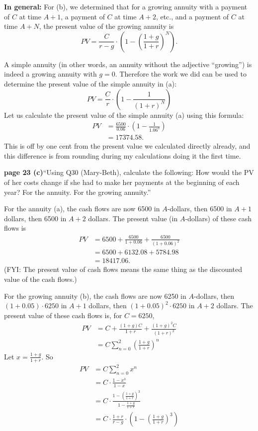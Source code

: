 \documentclass{amsart}
\begin{document}
\textbf{In general:} For (b), we determined that for a growing annuity
with a payment of $C$ at time $A+1$, a payment of $C$ at time $A+2$,
etc., and a payment of $C$ at time $A+N$, the present value of the growing annuity
is 
\begin{equation}
PV=\frac{C}{r-g} \cdot \left(1-\left(\frac{1+g}{1+r} \right)^N \right).
\end{equation}

A simple annuity (in other words, an annuity without the adjective ``growing'') is indeed a growing annuity with $g=0$. Therefore the work we
did can be used to determine the present value of the simple
annuity in (a):
\begin{equation}
PV = \frac{C}{r} \cdot \left(1-\frac{1}{(1+r)^N} \right)
\end{equation}
Let us calculate the present value of the simple annuity (a) using this
formula:
\begin{align*}
PV &= \frac{6500}{0.06} \cdot \left(1-\frac{1}{1.06^3} \right)\\
&=17374.58.
\end{align*}
This is off by one cent from the present value we calculated directly already,
and this difference is from rounding during my calculations doing it
the first time.

\newpage

\textbf{page 23 (c)}``Using Q30 (Mary-Beth), calculate the following:
How would the PV of her costs change if she had to make her payments at the beginning of each year? For the annuity. For the growing annuity.''

For the annuity (a), the cash flows are now
6500 in $A$-dollars, then 6500 in $A+1$ dollars, then 6500 in $A+2$
dollars. The present value (in $A$-dollars) of these cash flows is
\begin{align*}
PV&=6500+\frac{6500}{1+0.06} + \frac{6500}{(1+0.06)^2}\\
&=6500 + 6132.08 + 5784.98\\
&=18417.06.
\end{align*}
(FYI: The present value of cash flows means the same thing as the discounted
value of the cash flows.)

For the growing annuity (b), the cash flows are
now 6250 in $A$-dollars, then $(1+0.05) \cdot 6250$ in $A+1$ dollars,
then $(1+0.05)^2 \cdot 6250$ in $A+2$ dollars. The present value of these
cash flows is, for $C=6250$,
\begin{align*}
PV&= C + \frac{(1+g)C}{1+r} + \frac{(1+g)^2C}{(1+r)^2}\\
&=C \sum_{n=0}^2 \left( \frac{1+g}{1+r} \right)^n
\end{align*}
Let $x=\frac{1+g}{1+r}$. So
\begin{align*}
PV&=C \sum_{n=0}^2 x^n\\
&= C \cdot \frac{1-x^3}{1-x}\\
&= C \cdot \frac{1-\left( \frac{1+g}{1+r} \right)^3}{1-\frac{1+g}{1+r}}\\
&=C \cdot \frac{1+r}{r-g} \cdot \left(1-\left( \frac{1+g}{1+r} \right)^3\right)
\end{align*}
\end{document}
